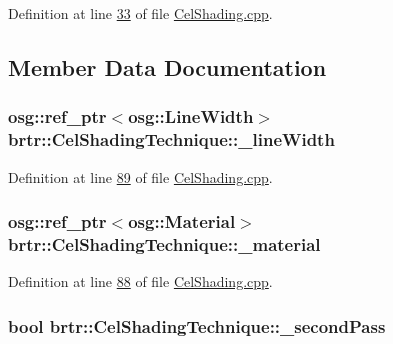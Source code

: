 Definition at line \hyperlink{_cel_shading_8cpp_source_l00033}{33} of file \hyperlink{_cel_shading_8cpp_source}{Cel\+Shading.\+cpp}.



\subsection{Member Data Documentation}
\hypertarget{classbrtr_1_1_cel_shading_technique_a2b943ddfe4db5a92b959217a8321584f}{
\subsubsection[{\+\_\+line\+Width}]{\setlength{\rightskip}{0pt plus 5cm}osg\+::ref\+\_\+ptr$<$osg\+::\+Line\+Width$>$ brtr\+::\+Cel\+Shading\+Technique\+::\+\_\+line\+Width\hspace{0.3cm}{\ttfamily [private]}}}\label{classbrtr_1_1_cel_shading_technique_a2b943ddfe4db5a92b959217a8321584f}


Definition at line \hyperlink{_cel_shading_8cpp_source_l00089}{89} of file \hyperlink{_cel_shading_8cpp_source}{Cel\+Shading.\+cpp}.

\hypertarget{classbrtr_1_1_cel_shading_technique_a266daa43a0effb4989755d61446dc14c}{
\subsubsection[{\+\_\+material}]{\setlength{\rightskip}{0pt plus 5cm}osg\+::ref\+\_\+ptr$<$osg\+::\+Material$>$ brtr\+::\+Cel\+Shading\+Technique\+::\+\_\+material\hspace{0.3cm}{\ttfamily [private]}}}\label{classbrtr_1_1_cel_shading_technique_a266daa43a0effb4989755d61446dc14c}


Definition at line \hyperlink{_cel_shading_8cpp_source_l00088}{88} of file \hyperlink{_cel_shading_8cpp_source}{Cel\+Shading.\+cpp}.

\hypertarget{classbrtr_1_1_cel_shading_technique_a096109e6280cd43bb55762509a3e9f0c}{
\subsubsection[{\+\_\+second\+Pass}]{\setlength{\rightskip}{0pt plus 5cm}bool brtr\+::\+Cel\+Shading\+Technique\+::\+\_\+second\+Pass\hspace{0.3cm}{\ttfamily [private]}}}\label{classbrtr_1_1_cel_shading_technique_a096109e6280cd43bb55762509a3e9f0c}


